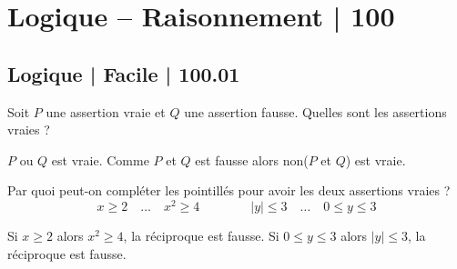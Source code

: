 


\section{Logique -- Raisonnement | 100}





\subsection{Logique | Facile | 100.01}


\begin{question}
Soit $P$ une assertion vraie et $Q$ une assertion fausse. Quelles sont les assertions vraies ?
\begin{answers}



\end{answers}
\begin{explanations}
$P$ ou $Q$ est vraie. Comme $P$ et $Q$ est fausse alors non($P$ et $Q$) est vraie.
\end{explanations}

\end{question}


\begin{question}
Par quoi peut-on compléter les pointillés pour avoir les deux assertions vraies ?
$$x\ge 2 \quad \ldots \quad x^2 \ge 4  \qquad \qquad |y| \le 3 \quad \ldots \quad 0 \le y \le 3$$
\begin{answers}


    
\end{answers}
\begin{explanations}
Si $x\ge 2$ alors $x^2 \ge 4$, la réciproque est fausse.
Si $0 \le y \le 3$ alors $|y| \le 3$, la réciproque est fausse.
\end{explanations}
\end{question}


